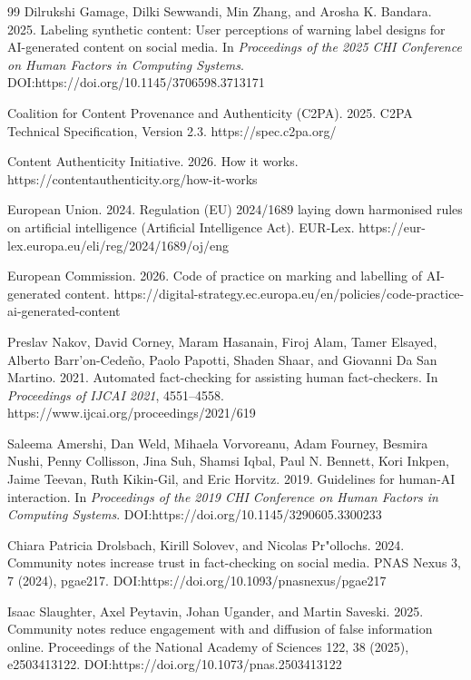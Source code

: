 \documentclass[acmlarge,screen,nonacm]{acmart}
\begin{document}
\begin{thebibliography}{99}
Dilrukshi Gamage, Dilki Sewwandi, Min Zhang, and Arosha K. Bandara. 2025. Labeling synthetic content: User perceptions of warning label designs for AI-generated content on social media. In \emph{Proceedings of the 2025 CHI Conference on Human Factors in Computing Systems}. DOI:https://doi.org/10.1145/3706598.3713171

Coalition for Content Provenance and Authenticity (C2PA). 2025. C2PA Technical Specification, Version 2.3. https://spec.c2pa.org/

Content Authenticity Initiative. 2026. How it works. https://contentauthenticity.org/how-it-works

European Union. 2024. Regulation (EU) 2024/1689 laying down harmonised rules on artificial intelligence (Artificial Intelligence Act). EUR-Lex. https://eur-lex.europa.eu/eli/reg/2024/1689/oj/eng

European Commission. 2026. Code of practice on marking and labelling of AI-generated content. https://digital-strategy.ec.europa.eu/en/policies/code-practice-ai-generated-content

Preslav Nakov, David Corney, Maram Hasanain, Firoj Alam, Tamer Elsayed, Alberto Barr'on-Cede\~no, Paolo Papotti, Shaden Shaar, and Giovanni Da San Martino. 2021. Automated fact-checking for assisting human fact-checkers. In \emph{Proceedings of IJCAI 2021}, 4551--4558. https://www.ijcai.org/proceedings/2021/619

Saleema Amershi, Dan Weld, Mihaela Vorvoreanu, Adam Fourney, Besmira Nushi, Penny Collisson, Jina Suh, Shamsi Iqbal, Paul N. Bennett, Kori Inkpen, Jaime Teevan, Ruth Kikin-Gil, and Eric Horvitz. 2019. Guidelines for human-AI interaction. In \emph{Proceedings of the 2019 CHI Conference on Human Factors in Computing Systems}. DOI:https://doi.org/10.1145/3290605.3300233

Chiara Patricia Drolsbach, Kirill Solovev, and Nicolas Pr"ollochs. 2024. Community notes increase trust in fact-checking on social media. PNAS Nexus 3, 7 (2024), pgae217. DOI:https://doi.org/10.1093/pnasnexus/pgae217

Isaac Slaughter, Axel Peytavin, Johan Ugander, and Martin Saveski. 2025. Community notes reduce engagement with and diffusion of false information online. Proceedings of the National Academy of Sciences 122, 38 (2025), e2503413122. DOI:https://doi.org/10.1073/pnas.2503413122


\end{thebibliography}
\end{document}
